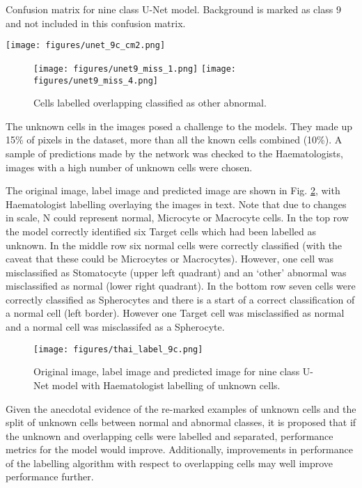 \documentclass[final,5p,times,twocolumn,authoryear]{elsarticle}
\begin{document}
\begin{table}[t!]
	\caption[U-Net 9 class: Confusion matrix]{Confusion matrix for nine class U-Net model. Background is marked as class 9 and not included in this confusion matrix.}
	\centering
	\texttt{[image: figures/unet\_9c\_cm2.png]}
	\label{fig:unet9c_cm}
\end{table}


\begin{figure}[t!]
	\centering
	\texttt{[image: figures/unet9\_miss\_1.png]}
	\texttt{[image: figures/unet9\_miss\_4.png]}
	\caption[Examples of misclassification 1]{Cells labelled overlapping classified as other abnormal.}
	\label{fig:unet9miss1}
\end{figure}


The unknown cells in the images posed a challenge to the models. They made up 15\% of pixels in the dataset, more than all the known cells combined (10\%). A sample of predictions made by the network was checked to the Haematologists, images with a high number of unknown cells were chosen. 


The original image, label image and predicted image are shown in Fig. \ref{fig:unet9cthailabel}, with Haematologist labelling overlaying the images in text. Note that due to changes in scale, N could represent normal, Microcyte or Macrocyte cells.
In the top row the model correctly identified six Target cells which had been labelled as unknown. In the middle row six normal cells were correctly classified (with the caveat that these could be Microcytes or Macrocytes). However, one cell was misclassified as Stomatocyte (upper left quadrant) and an `other' abnormal was misclassified as normal (lower right quadrant). In the bottom row seven cells were correctly classified as Spherocytes and there is a start of a correct classification of a normal cell (left border). However one Target cell was misclassified as normal and a normal cell was misclassifed as a Spherocyte.

\begin{figure}[t!]
	\centering
	\texttt{[image: figures/thai\_label\_9c.png]}
	\caption[U-Net 9 class: Predictions with Haematologist labelling of unknown cells]{Original image, label image and predicted image for nine class U-Net model with Haematologist labelling of unknown cells.}
	\label{fig:unet9cthailabel}
\end{figure}

Given the anecdotal evidence of the re-marked examples of unknown cells and the split of unknown cells between normal and abnormal classes, it is proposed that if the unknown and overlapping cells were labelled and separated, performance metrics for the model would improve. Additionally, improvements in performance of the labelling algorithm with respect to overlapping cells may well improve performance further.
\end{document}
